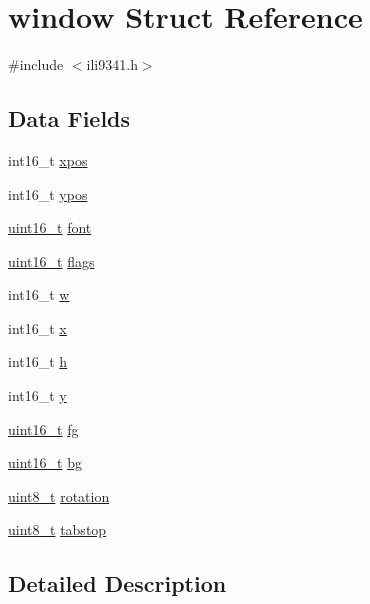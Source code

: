 \hypertarget{structwindow}{\section{window Struct Reference}
\label{structwindow}
}


{\ttfamily \#include $<$ili9341.\-h$>$}

\subsection*{Data Fields}
\begin{DoxyCompactItemize}
\item 
int16\-\_\-t \hyperlink{structwindow_a890a7dba31e7328500f4e5e41e51aab7}{xpos}
\item 
int16\-\_\-t \hyperlink{structwindow_a64bdec4f0ee274a96d696b16de783746}{ypos}
\item 
\hyperlink{send_8c_a273cf69d639a59973b6019625df33e30}{uint16\-\_\-t} \hyperlink{structwindow_acee24e56db43557a46cbb5ca3fe35021}{font}
\item 
\hyperlink{send_8c_a273cf69d639a59973b6019625df33e30}{uint16\-\_\-t} \hyperlink{structwindow_ad58fae853f87093ef4f0139df0a3f33d}{flags}
\item 
int16\-\_\-t \hyperlink{structwindow_ad89fdeb11ce94e2e7501f7290372d6ae}{w}
\item 
int16\-\_\-t \hyperlink{structwindow_a879b99940dfc34772f0257f54c67b817}{x}
\item 
int16\-\_\-t \hyperlink{structwindow_a822391abd5d09e6ce7152f68cff3ef2b}{h}
\item 
int16\-\_\-t \hyperlink{structwindow_a95c7023fc42e79ab42c291b90a490776}{y}
\item 
\hyperlink{send_8c_a273cf69d639a59973b6019625df33e30}{uint16\-\_\-t} \hyperlink{structwindow_ac8739cdb3c50efcc1deaa5ab955a5e62}{fg}
\item 
\hyperlink{send_8c_a273cf69d639a59973b6019625df33e30}{uint16\-\_\-t} \hyperlink{structwindow_affcf5d29153103c2537542f5a4f8ba87}{bg}
\item 
\hyperlink{send_8c_aba7bc1797add20fe3efdf37ced1182c5}{uint8\-\_\-t} \hyperlink{structwindow_afbd48ebcb41e68d0f458dac593578aa8}{rotation}
\item 
\hyperlink{send_8c_aba7bc1797add20fe3efdf37ced1182c5}{uint8\-\_\-t} \hyperlink{structwindow_a88d2836d45dd428d8fadfd703f0f965f}{tabstop}
\end{DoxyCompactItemize}


\subsection{Detailed Description}


